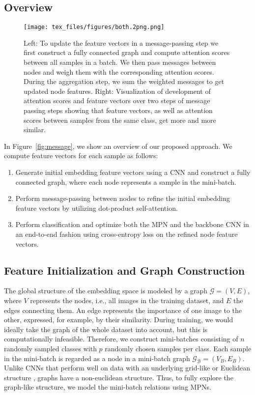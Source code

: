 \documentclass{article}
\begin{document}
\subsection{Overview}
\label{subsec:overview}

\begin{figure*}
\centerline{\texttt{[image: tex\_files/figures/both.2png.png]}}
   \caption{Left: To update the feature vectors in a message-passing step we first construct a fully connected graph and compute attention scores between all samples in a batch. We then pass messages between nodes and weigh them with the corresponding attention scores. During the aggregation step, we sum the weighted messages to get updated node features. 
Right: Visualization of development of attention scores and feature vectors over two steps of message passing steps showing that feature vectors, as well as attention scores between samples from the same class, get more and more similar.}
   \vspace{+0.3cm}
\label{fig:mpn2}
\end{figure*}



In Figure~\ref{fig:message}, we show an overview of our proposed approach. We compute feature vectors for each sample as follows:

\begin{enumerate}
    \item Generate initial embedding feature vectors using a CNN and construct a fully connected graph, where each node represents a sample in the mini-batch.
    \item Perform message-passing between nodes to refine the initial embedding feature vectors by utilizing dot-product self-attention.
    \item Perform classification and optimize both the MPN and the backbone CNN in an end-to-end fashion using cross-entropy loss on the refined node feature vectors. 
\end{enumerate}
\vspace{-0.3cm}
\subsection{Feature Initialization and Graph Construction}
\label{subsec:init}

The global structure of the embedding space is modeled by a graph $\mathcal{G} = (V, E)$, where $V$ represents the nodes, i.e., all images in the training dataset, and $E$ the edges connecting them. An edge represents the importance of one image to the other, expressed, for example, by their similarity.
During training, we would ideally take the graph of the whole dataset into account, but this is computationally infeasible. Therefore, we construct mini-batches consisting of $n$ randomly sampled classes with $p$ randomly chosen samples per class. Each sample in the mini-batch is regarded as a node in a mini-batch graph $\mathcal{G_B} = (V_B, E_B)$.
Unlike CNNs that perform well on data with an underlying grid-like or Euclidean structure \cite{GeoDeepL}, graphs have a non-euclidean structure. Thus, to fully explore the graph-like structure, we model the mini-batch relations using MPNs. 
\end{document}
